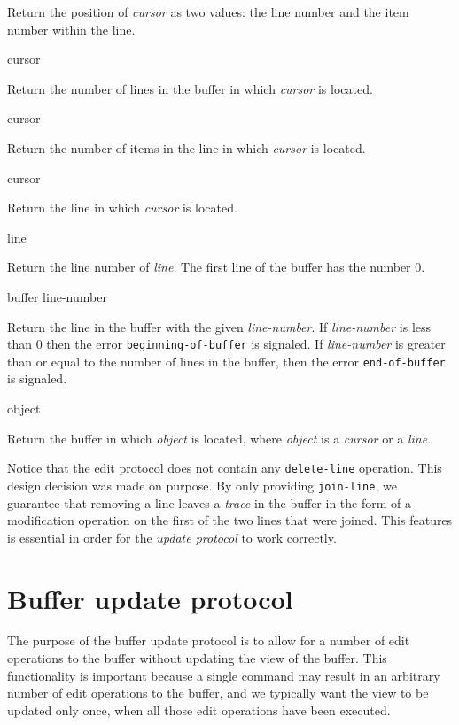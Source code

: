 Return the position of \textit{cursor} as two values: the line number
and the item number within the line. 

 {cursor}

Return the number of lines in the buffer in which \textit{cursor} is
located.

 {cursor}

Return the number of items in the line in which \textit{cursor} is
located.

 {cursor}

Return the line in which \textit{cursor} is located. 

 {line}

Return the line number of \textit{line}.  The first line of the buffer
has the number $0$. 

 {buffer line-number}

Return the line in the buffer with the given \textit{line-number}.  If
\textit{line-number} is less than $0$ then the error
\texttt{beginning-of-buffer} is signaled.  If \textit{line-number} is
greater than or equal to the number of lines in the buffer, then the
error \texttt{end-of-buffer} is signaled.

 {object}

Return the buffer in which \textit{object} is located, where
\textit{object} is a \emph{cursor} or a \emph{line}.

Notice that the edit protocol does not contain any
\texttt{delete-line} operation.  This design decision was made on
purpose.  By only providing \texttt{join-line}, we guarantee that
removing a line leaves a \emph{trace} in the buffer in the form of a
modification operation on the first of the two lines that were
joined.  This features is essential in order for the \emph{update
  protocol} to work correctly.

\section{Buffer update protocol}

The purpose of the buffer update protocol is to allow for a number of
edit operations to the buffer without updating the view of the buffer.
This functionality is important because a single command may result in
an arbitrary number of edit operations to the buffer, and we typically
want the view to be updated only once, when all those edit operations
have been executed.

